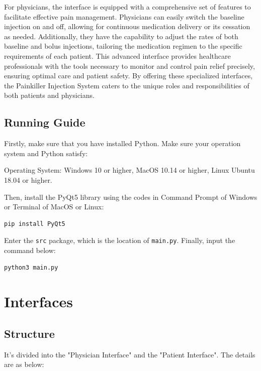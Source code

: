 \documentclass{article}
\begin{document}
For physicians, the interface is equipped with a comprehensive set of features to facilitate effective pain management. Physicians can easily switch the baseline injection on and off, allowing for continuous medication delivery or its cessation as needed. Additionally, they have the capability to adjust the rates of both baseline and bolus injections, tailoring the medication regimen to the specific requirements of each patient. This advanced interface provides healthcare professionals with the tools necessary to monitor and control pain relief precisely, ensuring optimal care and patient safety. By offering these specialized interfaces, the Painkiller Injection System caters to the unique roles and responsibilities of both patients and physicians.
\subsection{Running Guide}
Firstly, make sure that you have installed Python. Make sure your operation system and Python satisfy:

Operating System: Windows 10 or higher, MacOS 10.14 or higher, Linux Ubuntu 18.04 or higher.

Then, install the PyQt5 library using the codes in Command Prompt of Windows or Terminal of MacOS or Linux:
\begin{lstlisting}
pip install PyQt5
\end{lstlisting}
Enter the \lstinline!src! package, which is the location of \lstinline!main.py!.
Finally, input the command below:
\begin{lstlisting}
python3 main.py
\end{lstlisting}
\section{Interfaces}
\subsection{Structure}
It's divided into the "Physician Interface" and the "Patient Interface". The details are as below:
\end{document}
